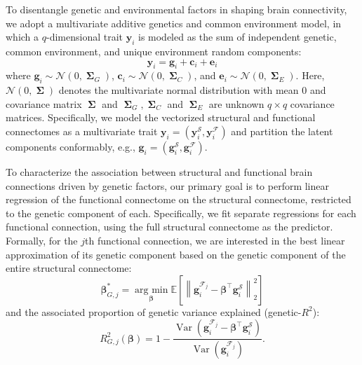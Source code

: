 \documentclass[12pt]{article}
\newcommand{\argmin}{\operatorname*{arg \ min}}
\DeclareMathOperator{\bSigma}{\mathbf{\Sigma}}
\DeclareMathOperator{\Var}{Var}
\begin{document}
To disentangle genetic and environmental factors in shaping brain connectivity, we adopt a multivariate additive genetics and common environment model, in which a  $q$-dimensional trait $\mathbf{y}_i$ is modeled as the sum of independent genetic, common environment, and unique environment random components:
\begin{equation}  \label{eq:multivariateindivmodel2}
\mathbf{y}_i = \mathbf{g}_i + \mathbf{c}_i + \mathbf{e}_i
\end{equation}
where
$\mathbf{g}_i \sim \mathcal{N}(0, \bSigma_G)$, $\mathbf{c}_i \sim \mathcal{N}(0, \bSigma_C)$, and $\mathbf{e}_i \sim \mathcal{N}(0, \bSigma_E)$. Here, $\mathcal{N}(0, \bSigma)$ denotes the multivariate normal distribution with mean $0$ and covariance matrix $\bSigma$ and $\bSigma_G, \bSigma_C$ and $\bSigma_E$ are unknown $q \times q$ covariance matrices. Specifically, we model the vectorized structural and functional connectomes as a multivariate trait $\mathbf{y}_i = \left(\mathbf{y}_i^{\mathcal{S}}, \mathbf{y}_i^{\mathcal{F}} \right)$ and partition the latent components conformably, e.g., $\mathbf{g}_i = \left(\mathbf{g}_i^{\mathcal{S}}, \mathbf{g}_i^{\mathcal{F}} \right)$.

To characterize the association between structural and functional brain connections driven by genetic factors, our primary goal is to perform linear regression of the functional connectome on the structural connectome, restricted to the genetic component of each. Specifically, we fit separate regressions for each functional connection, using the full structural connectome as the predictor. Formally, for the $j$th functional connection, we are interested in the best linear approximation of its genetic component based on the genetic component of the entire structural connectome:
\begin{equation} \label{eq:geneticbeta}
\boldsymbol{\beta}_{G, j}^* = \argmin_{\boldsymbol{\beta}} \mathbb{E}\left[ \left\|\mathbf{g}_{i}^{\mathcal{F}_j} - \boldsymbol{\beta}^\top \mathbf{g}_{i}^{\mathcal{S}} \right\|_2^2\right]
\end{equation}
and the associated proportion of genetic variance explained (genetic-$R^2$):
\begin{equation} \label{eq:geneticr2}
R^2_{G, j}(\boldsymbol{\beta}) = 1 - \frac{\Var\left(\mathbf{g}_{i}^{\mathcal{F}_j} - \boldsymbol{\beta}^\top \mathbf{g}_{i}^{\mathcal{S}}\right)}{\Var\left(\mathbf{g}_{i}^{\mathcal{F}_j}\right)}.
\end{equation}
\end{document}
